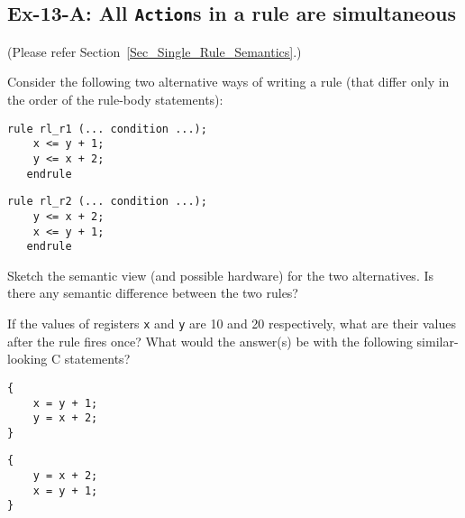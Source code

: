 
\subsection*{Ex-13-A: All {\tt Action}s in a rule are simultaneous}
\label{Ex-13-A-Simultaneous-Actions}

(Please refer Section~\ref{Sec_Single_Rule_Semantics}.)

Consider the following two alternative ways of writing a rule (that
differ only in the order of the rule-body statements):

\begin{center}
\begin{minipage}{0.4\textwidth}
 {\footnotesize
 \begin{Verbatim}[frame=single, label=BSV]
   rule rl_r1 (... condition ...);
    x <= y + 1;
    y <= x + 2;
   endrule
 \end{Verbatim}
 }
\end{minipage}
\hmm
\begin{minipage}{0.4\textwidth}
 {\footnotesize
 \begin{Verbatim}[frame=single,label=BSV]
   rule rl_r2 (... condition ...);
    y <= x + 2;
    x <= y + 1;
   endrule
 \end{Verbatim}
 }
\end{minipage}
\end{center}

Sketch the semantic view (and possible hardware) for the two
alternatives.  Is there any semantic difference between the two rules?

If the values of registers \verb|x| and \verb|y| are 10 and 20
respectively, what are their values after the rule fires once?  What
would the answer(s) be with the following similar-looking C
statements?

\begin{center}
\begin{minipage}{0.4\textwidth}
 {\footnotesize
 \begin{Verbatim}[frame=single, label=C/C++]
{
    x = y + 1;
    y = x + 2;
}
 \end{Verbatim}
 }
\end{minipage}
\hmm
\begin{minipage}{0.4\textwidth}
 {\footnotesize
 \begin{Verbatim}[frame=single, label=C/C++]
{
    y = x + 2;
    x = y + 1;
}
 \end{Verbatim}
 }
\end{minipage}
\end{center}

